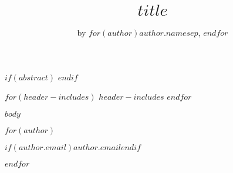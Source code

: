 \title{$title$}
\author{by $for(author)$$author.name$$sep$, $endfor$}

\maketitle

$if(abstract)$
$endif$

$for(header-includes)$
$header-includes$
$endfor$

$body$

$for(author)$
\address{%
$author.name$\\
$author.affiliation$\\
$for(author.address)$$author.address$$sep$\\ $endfor$\\
}
$if(author.email)$$author.email$$endif$

$endfor$

